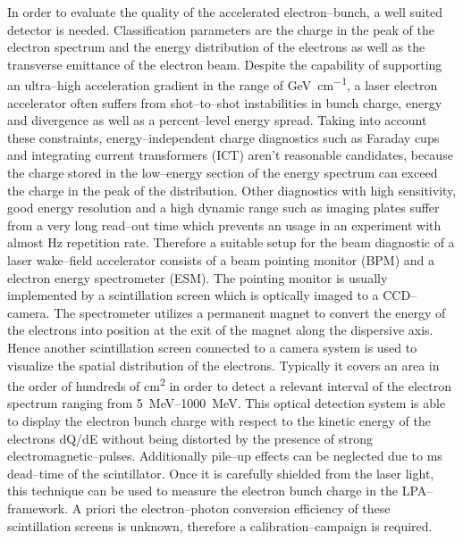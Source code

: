 \documentclass[%
reprint,
amsmath,
amssymb,
aip,
rsi, 
numerical,
floatfix,
]{revtex4-1}
\newcommand{\myCite}[1]{\textcolor{blue}{\cite{#1}}}
\begin{document}
In order to evaluate the quality of the accelerated electron--bunch, a well suited detector is needed. 
Classification parameters are the charge in the peak of the electron spectrum and the energy distribution of the electrons as well as the transverse emittance of the electron beam. 
Despite the capability of supporting an ultra--high acceleration gradient in the range of \si{\giga\electronvolt\per\centi\metre}, a laser electron accelerator often suffers from shot--to--shot instabilities in bunch charge, energy and divergence as well as a percent--level energy spread. 
Taking into account these constraints, energy--independent charge diagnostics such as Faraday cups and integrating current transformers (ICT) aren't reasonable candidates, because the charge stored in the low--energy section of the energy spectrum can exceed the charge in the peak of the distribution. 
Other diagnostics with high sensitivity, good energy resolution and a high dynamic range such as imaging plates\myCite{Tanaka2005,Masuda2008,Zeil2010,Bonnet2013} suffer from a very long read--out time which prevents an usage in an experiment with almost Hz repetition rate.
Therefore a suitable setup for the beam diagnostic of a laser wake--field accelerator consists of a beam pointing monitor (BPM) and a electron energy spectrometer (ESM). 
The pointing monitor is usually implemented by a scintillation screen which is optically imaged to a CCD--camera. 
The spectrometer utilizes a permanent magnet to convert the energy of the electrons into position at the exit of the magnet along the dispersive axis. 
Hence another scintillation screen connected to a camera system is used to visualize the spatial distribution of the electrons.
Typically it covers an area in the order of hundreds of \si{\centi\metre^2} in order to detect a relevant interval of the electron spectrum ranging from \SIrange{5}{1000}{\mega\electronvolt}. 
This optical detection system is able to display the electron bunch charge with respect to the kinetic energy of the electrons \si[per-mode=symbol]{dQ\per dE} without being distorted by the presence of strong electromagnetic--pulses. 
Additionally pile--up effects can be neglected due to \si{\milli\second} dead--time of the scintillator.
Once it is carefully shielded from the laser light, this technique can be used to measure the electron bunch charge in the LPA--framework. 
A priori the electron--photon conversion efficiency of these scintillation screens is unknown, therefore a calibration--campaign is required.
\end{document}
